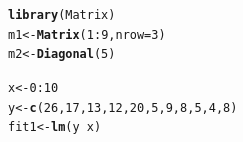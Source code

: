 \documentclass{config/apuntes}\usepackage[]{graphicx}\usepackage[]{xcolor}
\makeatletter
\newcommand{\hlnum}[1]{\textcolor[rgb]{0.686,0.059,0.569}{#1}}%
\newcommand{\hlopt}[1]{\textcolor[rgb]{0,0,0}{#1}}%
\newcommand{\hldef}[1]{\textcolor[rgb]{0.345,0.345,0.345}{#1}}%
\newcommand{\hlkwb}[1]{\textcolor[rgb]{0.69,0.353,0.396}{#1}}%
\newcommand{\hlkwc}[1]{\textcolor[rgb]{0.333,0.667,0.333}{#1}}%
\newcommand{\hlkwd}[1]{\textcolor[rgb]{0.737,0.353,0.396}{\textbf{#1}}}%
\newenvironment{kframe}{%
 \def\at@end@of@kframe{}%
 \ifinner\ifhmode%
  \def\at@end@of@kframe{\end{minipage}}%
  \begin{minipage}{\columnwidth}%
 \fi\fi%
 \def\FrameCommand##1{\hskip\@totalleftmargin \hskip-\fboxsep
 \colorbox{shadecolor}{##1}\hskip-\fboxsep
     \hskip-\linewidth \hskip-\@totalleftmargin \hskip\columnwidth}%
 \MakeFramed {\advance\hsize-\width
   \@totalleftmargin\z@ \linewidth\hsize
   \@setminipage}}%
 {\par\unskip\endMakeFramed%
 \at@end@of@kframe}
\newenvironment{knitrout}{}{} %
\makeatother
\begin{document}
\begin{knitrout}
\color{fgcolor}\begin{kframe}
\begin{alltt}
\hlkwd{library}\hldef{(Matrix)}
\hldef{m1} \hlkwb{<-} \hlkwd{Matrix}\hldef{(}\hlnum{1}\hlopt{:}\hlnum{9}\hldef{,} \hlkwc{nrow} \hldef{=} \hlnum{3}\hldef{)}
\hldef{m2} \hlkwb{<-} \hlkwd{Diagonal}\hldef{(}\hlnum{5}\hldef{)}

\hldef{x} \hlkwb{<-} \hlnum{0}\hlopt{:}\hlnum{10}
\hldef{y} \hlkwb{<-} \hlkwd{c}\hldef{(}\hlnum{26}\hldef{,} \hlnum{17}\hldef{,} \hlnum{13}\hldef{,} \hlnum{12}\hldef{,} \hlnum{20}\hldef{,} \hlnum{5}\hldef{,} \hlnum{9}\hldef{,} \hlnum{8}\hldef{,} \hlnum{5}\hldef{,} \hlnum{4}\hldef{,} \hlnum{8}\hldef{)}
\hldef{fit1} \hlkwb{<-} \hlkwd{lm}\hldef{(y} \hlopt{~} \hldef{x)}


\end{alltt}
\end{kframe}
\end{knitrout}
\end{document}
